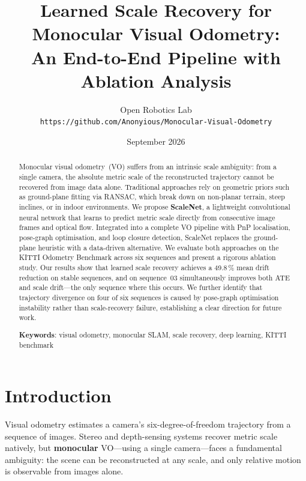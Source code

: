 \documentclass[12pt,a4paper]{article}
\title{Learned Scale Recovery for Monocular Visual Odometry:\\An End-to-End Pipeline with Ablation Analysis}
\author{Open Robotics Lab\\
\texttt{https://github.com/Anonyious/Monocular-Visual-Odometry}}
\date{September 2026}
\begin{document}
\maketitle

\begin{abstract}
Monocular visual odometry~(VO) suffers from an intrinsic scale ambiguity: from a single camera, the absolute metric scale of the reconstructed trajectory cannot be recovered from image data alone. Traditional approaches rely on geometric priors such as ground-plane fitting via RANSAC, which break down on non-planar terrain, steep inclines, or in indoor environments. We propose \textbf{ScaleNet}, a lightweight convolutional neural network that learns to predict metric scale directly from consecutive image frames and optical flow. Integrated into a complete VO pipeline with PnP localisation, pose-graph optimisation, and loop closure detection, ScaleNet replaces the ground-plane heuristic with a data-driven alternative. We evaluate both approaches on the KITTI Odometry Benchmark across six sequences and present a rigorous ablation study. Our results show that learned scale recovery achieves a 49.8\,\% mean drift reduction on stable sequences, and on sequence~03 simultaneously improves both ATE and scale drift---the only sequence where this occurs. We further identify that trajectory divergence on four of six sequences is caused by pose-graph optimisation instability rather than scale-recovery failure, establishing a clear direction for future work.

\textbf{Keywords}: visual odometry, monocular SLAM, scale recovery, deep learning, KITTI benchmark
\end{abstract}

\section{Introduction}

Visual odometry estimates a camera's six-degree-of-freedom trajectory from a sequence of images. Stereo and depth-sensing systems recover metric scale natively, but \textbf{monocular} VO---using a single camera---faces a fundamental ambiguity: the scene can be reconstructed at any scale, and only relative motion is observable from images alone.
\end{document}
